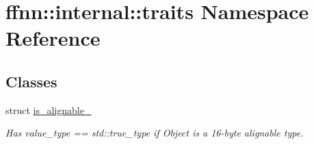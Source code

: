 \hypertarget{namespaceffnn_1_1internal_1_1traits}{\section{ffnn\-:\-:internal\-:\-:traits Namespace Reference}
\label{namespaceffnn_1_1internal_1_1traits}
}
\subsection*{Classes}
\begin{DoxyCompactItemize}
\item 
struct \hyperlink{structffnn_1_1internal_1_1traits_1_1is__alignable__128}{is\-\_\-alignable\-\_}
\begin{DoxyCompactList}\small\item\em Has {\ttfamily value\-\_\-type == std\-::true\-\_\-type} if {\ttfamily Object} is a 16-\/byte alignable type. \end{DoxyCompactList}\end{DoxyCompactItemize}
